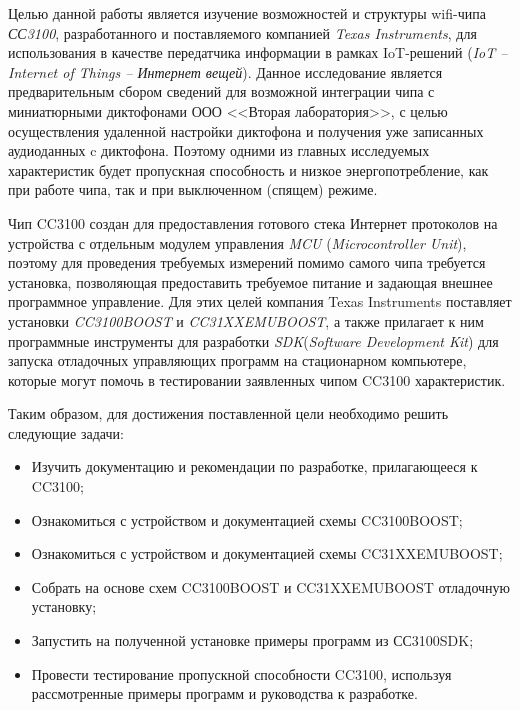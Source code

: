 \Introduction

Целью данной работы является изучение возможностей и
структуры wifi-чипа \textit{СС3100}\cite{cc3100}, разработанного и
поставляемого компанией \textit{Texas Instruments}, для использования
в качестве передатчика информации в рамках IoT-решений
(\textit{IoT -- Internet of Things -- Интернет вещей}).
Данное исследование является предварительным сбором сведений
для возможной интеграции чипа с миниатюрными диктофонами
ООО <<Вторая лаборатория>>\cite{labi2dicts}, с целью
осуществления удаленной настройки диктофона и получения
уже записанных аудиоданных c диктофона. Поэтому одними
из главных исследуемых характеристик будет пропускная способность
и низкое энергопотребление, как при работе чипа, так и при
выключенном (спящем) режиме.

Чип CC3100 создан для предоставления готового стека
Интернет протоколов на устройства с отдельным модулем управления
\textit{MCU} (\textit{Microcontroller Unit}), поэтому для
проведения требуемых измерений помимо самого чипа
требуется установка, позволяющая предоставить
требуемое питание и задающая внешнее программное управление.
Для этих целей компания Texas Instruments поставляет
установки \textit{CC3100BOOST}\cite{cc3100boost} и \textit{CC31XXEMUBOOST}\cite{cc31xxemuboost},
а также прилагает к ним программные инструменты для разработки
\textit{SDK}(\textit{Software Development Kit}) для запуска
отладочных управляющих программ на стационарном компьютере,
которые могут помочь в тестировании заявленных чипом CC3100
характеристик.

\clearpage
Таким образом, для достижения поставленной цели необходимо решить следующие задачи:

\begin{itemize}
\item Изучить документацию и рекомендации по разработке, прилагающееся к CC3100;
\item Ознакомиться с устройством и документацией схемы CC3100BOOST;
\item Ознакомиться с устройством и документацией схемы CC31XXEMUBOOST;
\item Собрать на основе схем CC3100BOOST и CC31XXEMUBOOST отладочную установку;
\item Запустить на полученной установке примеры программ из СС3100SDK;
\item Провести тестирование пропускной способности CC3100, используя рассмотренные примеры
программ и руководства к разработке.
\end{itemize}
